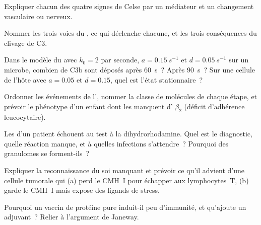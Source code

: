 \begin{exercise}[$\star$]\label{exo:b3:innate-immunity:3}
Expliquer chacun des quatre signes de Celse par un médiateur et un
changement vasculaire ou nerveux.
\end{exercise}

\begin{exercise}[$\star$]\label{exo:b3:innate-immunity:4}
Nommer les trois voies du , ce qui déclenche chacune, et les
trois conséquences du clivage de C3.
\end{exercise}

\begin{exercise}[$\star\star$]\label{exo:b3:innate-immunity:5}
Dans le modèle du  avec $k_{0} = 2$ par seconde, $a =
\qty{0.15}{s^{-1}}$ et $d = \qty{0.05}{s^{-1}}$ sur un microbe, combien
de C3b sont déposés après \qty{60}{s}~? Après \qty{90}{s}~? Sur une
cellule de l'hôte avec $a = 0.05$ et $d = 0.15$, quel est l'état
stationnaire~?
\end{exercise}

\begin{exercise}[$\star\star$]\label{exo:b3:innate-immunity:6}
Ordonner les événements de l', nommer la classe de
molécules de chaque étape, et prévoir le phénotype d'un enfant dont les
 manquent d' $\beta_{2}$ (déficit d'adhérence
leucocytaire).
\end{exercise}

\begin{exercise}[$\star\star$]\label{exo:b3:innate-immunity:7}
Les  d'un patient échouent au test à la dihydrorhodamine.
Quel est le diagnostic, quelle réaction manque, et à quelles infections
s'attendre~? Pourquoi des granulomes se forment-ils~?
\end{exercise}

\begin{exercise}[$\star\star$]\label{exo:b3:innate-immunity:8}
Expliquer la reconnaissance du soi manquant et prévoir ce qu'il advient
d'une cellule tumorale qui (a) perd le CMH~I pour échapper aux
lymphocytes~T, (b) garde le CMH~I mais expose des ligands de stress.
\end{exercise}

\begin{exercise}[$\star\star$]\label{exo:b3:innate-immunity:9}
Pourquoi un vaccin de protéine pure induit-il peu d'immunité, et
qu'ajoute un adjuvant~? Relier à l'argument de Janeway.
\end{exercise}

